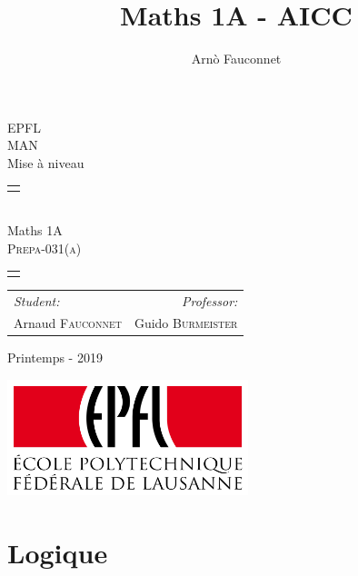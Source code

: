 \documentclass[
    11pt,
    a4paper,
    oneside,
    headinlcude, footinclude,
    twoside,
]{report}
\title{Maths 1A - AICC}
\author{Arnò Fauconnet}
\begin{document}
\begin{titlepage}
   \begin{center}
       \vspace*{\fill}

       {\Huge EPFL}\\ 
       \vfill
       {\huge MAN}\\ [1em]
       {\Large Mise à niveau}\\
        \vfill
        \begin{tabularx}{\textwidth}{X}
            \Xhline{3\arrayrulewidth}\\
        \end{tabularx}\\ [2em]
        {\Huge Maths 1A} \\ [1em]
        \textsc{\huge Prepa-031(a)} \\ [2em]
       \begin{tabularx}{\textwidth}{X}
            \Xhline{3\arrayrulewidth}\\
        \end{tabularx}
        \vspace{.7cm}
        {\large
        \begin{tabularx}{.9\textwidth}{Xr}
            \textit{Student:} & \textit{Professor:}\\
            Arnaud \textsc{Fauconnet} & Guido \textsc{Burmeister}
        \end{tabularx}}
        \vfill
        {\Large Printemps - 2019}

        \vfill
        \includegraphics[width=7cm]{epfl-logo}

       \vfill
   \end{center} 
\end{titlepage} 
\setcounter{chapter}{0}
\chapter{Logique}
\label{cha:logique}
\end{document}
